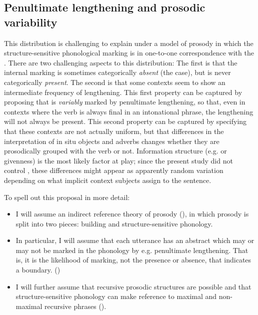 \documentclass[output=paper,modfonts,nonflat,hidelinks]{langsci/langscibook}
\begin{document}
\subsection{Penultimate lengthening and prosodic variability}

This distribution is challenging to explain under a model of prosody in which
the structure-sensitive phonological marking is in one-to-one correspondence
with the . There are two challenging aspects to this
distribution: The first is that the internal marking is sometimes categorically
\textit{absent} (the  case), but is never categorically
\textit{present}. The second is that some contexts seem to show an intermediate
frequency of lengthening. This first property can be captured by proposing that
 is \textit{variably} marked by penultimate lengthening, so
that, even in contexts where the verb is always final in an intonational
phrase, the lengthening will not always be present. This second property can be
captured by specifying that these contexts are not actually uniform, but that
differences in the interpretation of  {in situ} objects and adverbs
changes whether they are prosodically grouped with the verb or not. Information
structure (e.g.  or givenness) is the most likely factor at play; since the
present study did not control , these differences might
appear as apparently random variation depending on what implicit context
subjects assign to the sentence.

To spell out this proposal in more detail:

\begin{itemize}

	\item I will assume an indirect reference theory of prosody
		(\citealt{Selkirk11}),
		in which prosody is split into two pieces:  building
		and structure-sensitive phonology.

	\item In particular, I will assume that each utterance has an abstract
		 which may or may not be marked in the phonology by
		e.g. penultimate lengthening. That is, it is the likelihood of marking,
		not the presence or absence, that indicates a boundary.
		(\citealt{Elfner2016})

	\item I will further assume that recursive prosodic structures are possible
		and that structure-sensitive phonology can make reference to maximal
		and non-maximal recursive phrases (\citealt{ItoMester12}). 
\end{itemize}
\end{document}

